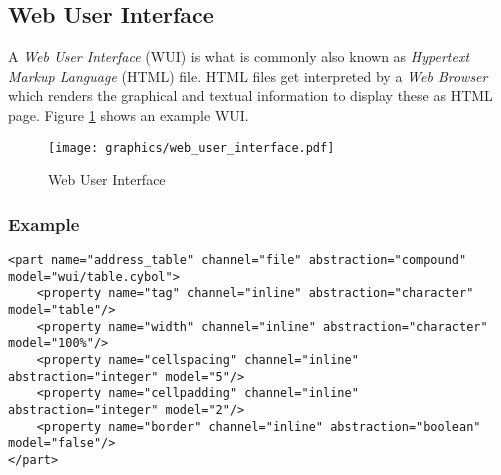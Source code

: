 %
%
%
%
%
%

\subsection{Web User Interface}
\label{web_user_interface_heading}

A \emph{Web User Interface} (WUI) is what is commonly also known as
\emph{Hypertext Markup Language} (HTML) file. HTML files get interpreted by a
\emph{Web Browser} which renders the graphical and textual information to
display these as HTML page. Figure \ref{web_user_interface_figure} shows an
example WUI.

\begin{figure}[ht]
    \begin{center}
        \texttt{[image: graphics/web\_user\_interface.pdf]}
        \caption{Web User Interface}
        \label{web_user_interface_figure}
    \end{center}
\end{figure}

\subsubsection{Example}

\begin{scriptsize}
    \begin{verbatim}
<part name="address_table" channel="file" abstraction="compound" model="wui/table.cybol">
    <property name="tag" channel="inline" abstraction="character" model="table"/>
    <property name="width" channel="inline" abstraction="character" model="100%"/>
    <property name="cellspacing" channel="inline" abstraction="integer" model="5"/>
    <property name="cellpadding" channel="inline" abstraction="integer" model="2"/>
    <property name="border" channel="inline" abstraction="boolean" model="false"/>
</part>
    \end{verbatim}
\end{scriptsize}

